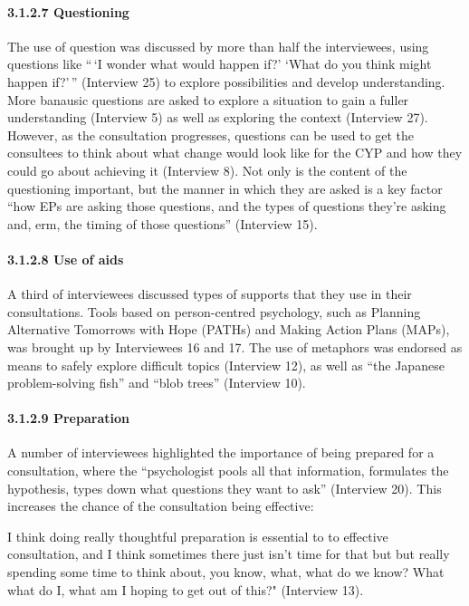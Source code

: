 \documentclass[
]{article}
\begin{document}
\hypertarget{questioning}{%
\paragraph{3.1.2.7 Questioning}\label{questioning}}

The use of question was discussed by more than half the interviewees,
using questions like ``\,`I wonder what would happen if?' `What do you
think might happen if?'\,'' (Interview 25) to explore possibilities and
develop understanding. More banausic questions are asked to explore a
situation to gain a fuller understanding (Interview 5) as well as
exploring the context (Interview 27). However, as the consultation
progresses, questions can be used to get the consultees to think about
what change would look like for the CYP and how they could go about
achieving it (Interview 8). Not only is the content of the questioning
important, but the manner in which they are asked is a key factor ``how
EPs are asking those questions, and the types of questions they're
asking and, erm, the timing of those questions'' (Interview 15).

\hypertarget{use-of-aids}{%
\paragraph{3.1.2.8 Use of aids}\label{use-of-aids}}

A third of interviewees discussed types of supports that they use in
their consultations. Tools based on person-centred psychology, such as
Planning Alternative Tomorrows with Hope (PATHs) and Making Action Plans
(MAPs), was brought up by Interviewees 16 and 17. The use of metaphors
was endorsed as means to safely explore difficult topics (Interview 12),
as well as ``the Japanese problem-solving fish'' and ``blob trees''
(Interview 10).

\hypertarget{preparation}{%
\paragraph{3.1.2.9 Preparation}\label{preparation}}

A number of interviewees highlighted the importance of being prepared
for a consultation, where the ``psychologist pools all that information,
formulates the hypothesis, types down what questions they want to ask''
(Interview 20). This increases the chance of the consultation being
effective:

I think doing really thoughtful preparation is essential to to effective
consultation, and I think sometimes there just isn't time for that but
but really spending some time to think about, you know, what, what do we
know? What what do I, what am I hoping to get out of this?" (Interview
13).
\end{document}
